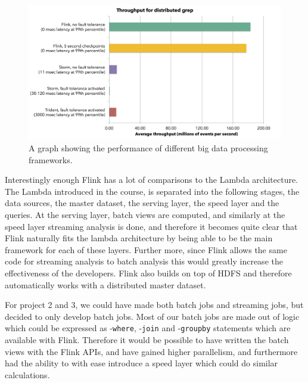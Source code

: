 \begin{figure}[H]
	\includegraphics[width=\linewidth]{figures/flink_throughput.png}
	\caption{A graph showing the performance of different big data processing frameworks.}
	\label{fig:flink_bench}
\end{figure}

\newpar Interestingly enough Flink has a lot of comparisons to the Lambda architecture. The Lambda introduced in the course, is separated into the following stages, the data sources, the master dataset, the serving layer, the speed layer and the queries. At the serving layer, batch views are computed, and similarly at the speed layer streaming analysis is done, and therefore it becomes quite clear that Flink naturally fits the lambda architecture by being able to be the main framework for each of these layers. Further more, since Flink allows the same code for streaming analysis to batch analysis this would greatly increase the effectiveness of the developers. Flink also builds on top of HDFS and therefore automatically works with a distributed master dataset.

\newpar For project 2 and 3, we could have made both batch jobs and streaming jobs, but decided to only develop batch jobs. Most of our batch jobs are made out of logic which could be expressed as -\texttt{where}, -\texttt{join} and -\texttt{groupby} statements which are available with Flink. Therefore it would be possible to have written the batch views with the Flink APIs, and have gained higher parallelism, and furthermore had the ability to with ease introduce a speed layer which could do similar calculations. 

